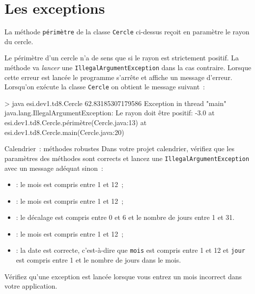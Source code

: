 \documentclass[a4paper,11pt]{style-esi/td}
\begin{document}

\section{Les exceptions}

	
	
	

	La méthode \texttt{périmètre} de la classe \texttt{Cercle} ci-dessus
	reçoit en paramètre le rayon du cercle.
	
	Le périmètre d'un cercle n'a de sens que si le rayon est strictement positif.  
	La méthode va \emph{lancer} une \texttt{IllegalArgumentException} dans la cas contraire. 
	Lorsque cette erreur est lancée le programme s'arrête et affiche un message d'erreur.
	Lorsqu'on exécute la classe \texttt{Cercle} on obtient le message suivant~:
	\begin{Console}
> java esi.dev1.td8.Cercle
62.83185307179586
Exception in thread "main" java.lang.IllegalArgumentException: Le rayon doit être positif: -3.0
	at esi.dev1.td8.Cercle.périmètre(Cercle.java:13)
	at esi.dev1.td8.Cercle.main(Cercle.java:20)
\end{Console}

	\begin{Exercice}{Calendrier~: méthodes robustes}
		Dans votre projet calendrier, vérifiez que les paramètres des méthodes sont corrects et lancez une 
		\texttt{IllegalArgumentException} avec un message adéquat sinon~:
		\begin{itemize}
			\item {}: le mois est compris entre 1 et 12~;
			\item {}: le mois est compris entre 1 et 12~;
			\item {}: le décalage est compris entre 0 et 6 et 
				le nombre de jours entre 1 et 31.
			\item  {}: le mois est compris entre 1 et 12~;
			\item {}: la date est correcte, c'est-à-dire 
			que \texttt{mois} est compris entre 1 et 12 et \texttt{jour} est compris entre 1 et le nombre de 
			jours dans le mois. 
		\end{itemize}
		
		Vérifiez qu'une exception est lancée lorsque vous entrez un mois incorrect dans votre application.
	\end{Exercice}
\end{document}
